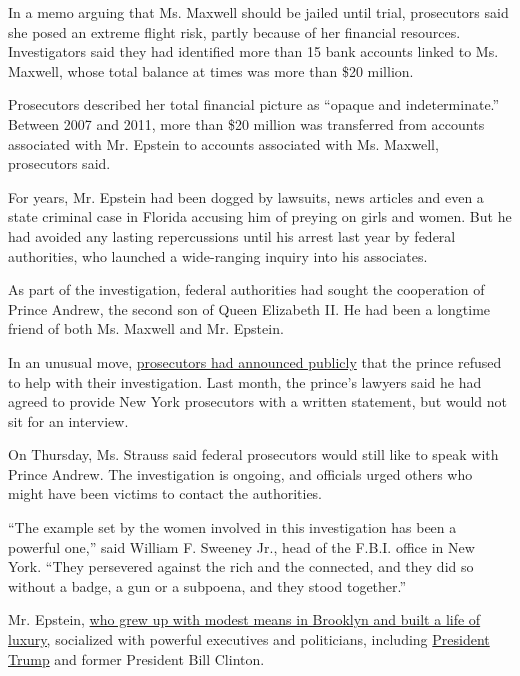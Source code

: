 In a memo arguing that Ms. Maxwell should be jailed until trial,
prosecutors said she posed an extreme flight risk, partly because of her
financial resources. Investigators said they had identified more than 15
bank accounts linked to Ms. Maxwell, whose total balance at times was
more than \$20 million.

Prosecutors described her total financial picture as ``opaque and
indeterminate.'' Between 2007 and 2011, more than \$20 million was
transferred from accounts associated with Mr. Epstein to accounts
associated with Ms. Maxwell, prosecutors said.

For years, Mr. Epstein had been dogged by lawsuits, news articles and
even a state criminal case in Florida accusing him of preying on girls
and women. But he had avoided any lasting repercussions until his arrest
last year by federal authorities, who launched a wide-ranging inquiry
into his associates.

As part of the investigation, federal authorities had sought the
cooperation of Prince Andrew, the second son of Queen Elizabeth II. He
had been a longtime friend of both Ms. Maxwell and Mr. Epstein.

In an unusual move,
\href{https://www.nytimes.com/2020/06/08/nyregion/jeffrey-epstein-prince-andrew.html}{prosecutors
had announced publicly} that the prince refused to help with their
investigation. Last month, the prince's lawyers said he had agreed to
provide New York prosecutors with a written statement, but would not sit
for an interview.

On Thursday, Ms. Strauss said federal prosecutors would still like to
speak with Prince Andrew. The investigation is ongoing, and officials
urged others who might have been victims to contact the authorities.

``The example set by the women involved in this investigation has been a
powerful one,'' said William F. Sweeney Jr., head of the F.B.I. office
in New York. ``They persevered against the rich and the connected, and
they did so without a badge, a gun or a subpoena, and they stood
together.''

Mr. Epstein,
\href{https://www.nytimes.com/2019/07/10/business/jeffrey-epstein-net-worth.html}{who
grew up with modest means in Brooklyn and built a life of luxury,}
socialized with powerful executives and politicians, including
\href{https://www.nytimes.com/2020/07/21/nyregion/trump-ghislaine-maxwell-jeffrey-epstein.html}{President
Trump} and former President Bill Clinton.

